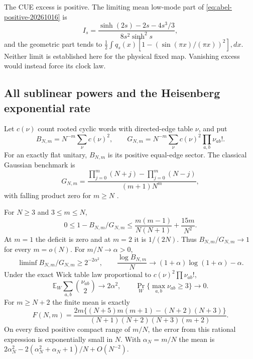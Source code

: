 The CUE excess is positive. The limiting mean low-mode part of
\eqref{eq:abel-positive-20261016} is
\[
 I_s=\frac{\sinh(2s)-2s-4s^3/3}{8s^2\sinh^2s},
\]
and the geometric part tends to
$\tfrac12\int q_s(x)[1-(\sin(\pi x)/(\pi x))^2],dx$.
Neither limit is established here for the physical fixed map. Vanishing
excess would instead force its clock law.

\subsection{All sublinear powers and the Heisenberg exponential rate}
Let $c(\nu)$ count rooted cyclic words with directed-edge table $\nu$, and put
\[
 B_{N,m}=N^{-m}\sum_\nu c(\nu)^2,\qquad
 G_{N,m}=N^{-m}\sum_\nu c(\nu)^2\prod_{a,b}\nu_{ab}!.
\]
For an exactly flat unitary, $B_{N,m}$ is its positive equal-edge sector.
The classical Gaussian benchmark is
\[
 G_{N,m}=\frac{\prod_{j=0}^m(N+j)-\prod_{j=0}^m(N-j)}
                     {(m+1)N^m},
\]
with falling product zero for $m\ge N$ \cite{KPSS2002}.
\begin{theorem}
For $N\ge3$ and $3\le m\le N$,
\[
 0\le1-B_{N,m}/G_{N,m}
       \le\frac{m(m-1)}{N(N+1)}+\frac{15m}{N^2}.
\]
At $m=1$ the deficit is zero and at $m=2$ it is $1/(2N)$. Thus
$B_{N,m}/G_{N,m}\to1$ for every $m=o(N)$. For $m/N\to\alpha>0$,
\[
 \liminf B_{N,m}/G_{N,m}\ge2^{-2\alpha^2},\qquad
 \frac{\log B_{N,m}}N\longrightarrow
                 (1+\alpha)\log(1+\alpha)-\alpha.
\]
Under the exact Wick table law proportional to $c(\nu)^2\prod\nu_{ab}!$,
\[
 \mathbb E_W\sum_{a,b}\binom{\nu_{ab}}2\longrightarrow2\alpha^2,
 \qquad \Pr_W\{\max_{a,b}\nu_{ab}\ge3\}\longrightarrow0.
\]
For $m\ge N+2$ the finite mean is exactly
\[
 F(N,m)=\frac{2m\{(N+5)m(m+1)-(N+2)(N+3)\}}
                    {(N+1)(N+2)(N+3)(m+2)}.
\]
On every fixed positive compact range of $m/N$, the error from this rational
expression is exponentially small in $N$. With $\alpha_N=m/N$ the mean is
$2\alpha_N^2-2(\alpha_N^2+\alpha_N+1)/N+O(N^{-2})$.
\end{theorem}
